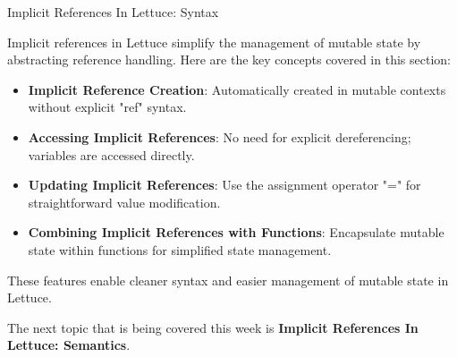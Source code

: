 \begin{notes}{Implicit References In Lettuce: Syntax}
    \begin{highlight}
    
        Implicit references in Lettuce simplify the management of mutable state by abstracting reference handling. Here are the key concepts covered in this section:
    
        \begin{itemize}
            \item \textbf{Implicit Reference Creation}: Automatically created in mutable contexts without explicit "ref" syntax.
            \item \textbf{Accessing Implicit References}: No need for explicit dereferencing; variables are accessed directly.
            \item \textbf{Updating Implicit References}: Use the assignment operator "=" for straightforward value modification.
            \item \textbf{Combining Implicit References with Functions}: Encapsulate mutable state within functions for simplified state management.
        \end{itemize}
    
        These features enable cleaner syntax and easier management of mutable state in Lettuce.
    
    \end{highlight}
\end{notes}

The next topic that is being covered this week is \textbf{Implicit References In Lettuce: Semantics}.

